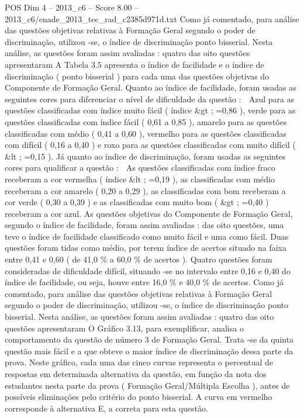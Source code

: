 \begin{textsample}{POS Dim 4 – 2013\_c6 – Score 8.00 – 2013\_c6/enade\_2013\_tec\_rad\_c2385d971d.txt}
Como já comentado, para análise das questões objetivas relativas à Formação Geral segundo o poder de discriminação, utilizou -se, o índice de discriminação ponto bisserial.
Nesta análise, as questões foram assim avaliadas : quatro das oito questões apresentaram A Tabela 3.5 apresenta o índice de facilidade e o índice de discriminação ( ponto bisserial ) para cada uma das questões objetivas do Componente de Formação Geral.
Quanto ao índice de facilidade, foram usadas as seguintes cores para diferenciar o nível de dificuldade da questão :  Azul para as questões classificadas com índice muito fácil ( índice \&gt ; =0,86 ), verde para as questões classificadas com índice fácil ( 0,61 a 0,85 ), amarelo para as questões classificadas com médio ( 0,41 a 0,60 ), vermelho para as questões classificadas com difícil ( 0,16 a 0,40 ) e roxo para as questões classificadas com muito difícil ( \&lt ; =0,15 ).
Já quanto ao índice de discriminação, foram usadas as seguintes cores para qualificar a questão :  As questões classificadas com índice fraco receberam a cor vermelha ( índice \&lt ; =0,19 ), as classificadas com médio receberam a cor amarelo ( 0,20 a 0,29 ), as classificadas com bom receberam a cor verde ( 0,30 a 0,39 ) e as classificadas com muito bom ( \&gt ; =0,40 ) receberam a cor azul.
As questões objetivas do Componente de Formação Geral, segundo o índice de facilidade, foram assim avaliadas : das oito questões, uma teve o índice de facilidade classificado como muito fácil e uma como fácil.
Duas questões foram tidas como médio, por terem índice de acertos situado na faixa entre 0,41 e 0,60 ( de 41,0 \% a 60,0 \% de acertos ).
Quatro questões foram consideradas de dificuldade difícil, situando -se no intervalo entre 0,16 e 0,40 do índice de facilidade, ou seja, houve entre 16,0 \% e 40,0 \% de acertos.
Como já comentado, para análise das questões objetivas relativas à Formação Geral segundo o poder de discriminação, utilizou -se, o índice de discriminação ponto bisserial.
Nesta análise, as questões foram assim avaliadas : quatro das oito questões apresentaram O Gráfico 3.13, para exemplificar, analisa o comportamento da questão de número 3 de Formação Geral.
Trata -se da quinta questão mais fácil e a que obteve o maior índice de discriminação dessa parte da prova.
Neste gráfico, cada uma das cinco curvas representa o percentual de respostas em determinada alternativa da questão, em função da nota dos estudantes nesta parte da prova ( Formação Geral/Múltipla Escolha ), antes de possíveis eliminações pelo critério do ponto bisserial.
A curva em vermelho corresponde à alternativa E, a correta para esta questão.

\end{textsample}
